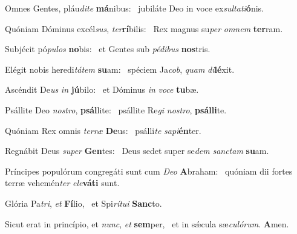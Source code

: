 \item Omnes Gentes, pláu\textit{dite} \textbf{má}nibus:~\psstar{} jubiláte Deo in voce ex\textit{sultati}\textbf{ó}nis.
\item Quóniam Dóminus excél\textit{sus}, \textit{ter}\textbf{rí}bilis:~\psstar{} Rex magnus su\textit{per} \textit{omnem} \textbf{ter}ram.
\item Subjécit pó\textit{pulos} \textbf{no}bis:~\psstar{} et Gentes sub \textit{pédibus} \textbf{nos}tris.
\item Elégit nobis heredi\textit{tátem} \textbf{su}am:~\psstar{} spéciem Ja\textit{cob}, \textit{quam} \textit{di}\textbf{lé}xit.
\item Ascéndit De\textit{us} \textit{in} \textbf{jú}bilo:~\psstar{} et Dóminus \textit{in} \textit{voce} \textbf{tu}bæ.
\item Psállite Deo \textit{nostro}, \textbf{psál}lite:~\psstar{} psállite Re\textit{gi} \textit{nostro}, \textbf{psál}\textbf{li}te.
\item Quóniam Rex omnis \textit{terræ} \textbf{De}us:~\psstar{} psálli\textit{te} \textit{sapi}\textbf{én}ter.
\item Regnábit Deus \textit{super} \textbf{Gen}tes:~\psstar{} Deus sedet super se\textit{dem} \textit{sanctam} \textbf{su}am.
\item Príncipes populórum congre\-gáti sunt cum \textit{Deo} \textbf{A}braham:~\psstar{} quóniam dii fortes terræ vehemén\textit{ter} \textit{ele}\textbf{vá}\textbf{ti} sunt.
\item Glória Pa\textit{tri}, \textit{et} \textbf{Fí}lio,~\psstar{} et Spi\textit{rítui} \textbf{Sanc}to.
\item Sicut erat in princípio, et \textit{nunc}, \textit{et} \textbf{sem}per,~\psstar{} et in sǽcula sæ\textit{culórum}. \textbf{A}men.
